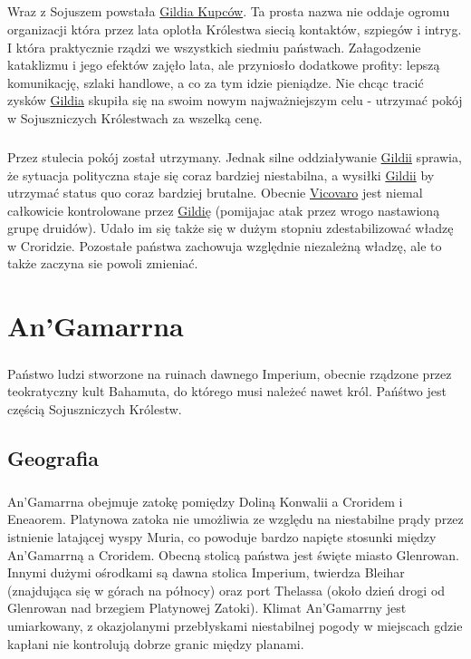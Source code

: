 \paragraph{}
Wraz z Sojuszem powstała \hyperref[GildiaKupcow]{Gildia Kupców}.
Ta prosta nazwa nie oddaje ogromu organizacji która przez lata oplotła Królestwa siecią kontaktów, szpiegów i intryg.
I która praktycznie rządzi we wszystkich siedmiu państwach.
Załagodzenie kataklizmu i jego efektów zajęło lata, ale przyniosło dodatkowe profity: lepszą komunikację, szlaki handlowe, a co za tym idzie pieniądze.
Nie chcąc tracić zysków \hyperref[GildiaKupcow]{Gildia} skupiła się na swoim nowym najważniejszym celu - utrzymać pokój w Sojuszniczych Królestwach za wszelką cenę.

\paragraph{}
Przez stulecia pokój został utrzymany.
Jednak silne oddziaływanie \hyperref[GildiaKupcow]{Gildii} sprawia, że sytuacja polityczna staje się coraz bardziej niestabilna, a wysiłki \hyperref[GildiaKupcow]{Gildii} by utrzymać status quo coraz bardziej brutalne.
Obecnie \hyperref[Vicovaro]{Vicovaro} jest niemal całkowicie kontrolowane przez \hyperref[GildiaKupcow]{Gildię} (pomijajac atak przez wrogo nastawioną grupę druidów).
Udało im się także się w dużym stopniu zdestabilizować władzę w Croridzie.
Pozostałe państwa zachowuja względnie niezależną władzę, ale to także zaczyna sie powoli zmieniać.

\chapter{An'Gamarrna}

\paragraph{}
Państwo ludzi stworzone na ruinach dawnego Imperium, obecnie rządzone przez teokratyczny kult Bahamuta, do którego musi należeć nawet król.
Pańśtwo jest częścią Sojuszniczych Królestw.

\section{Geografia}
\paragraph{}
An'Gamarrna obejmuje zatokę pomiędzy Doliną Konwalii a Croridem i Eneaorem.
Platynowa zatoka nie umożliwia ze względu na niestabilne prądy przez istnienie latającej wyspy Muria, co powoduje bardzo napięte stosunki między An'Gamarrną a Croridem.
Obecną stolicą państwa jest święte miasto Glenrowan.
Innymi dużymi ośrodkami są dawna stolica Imperium, twierdza Bleihar (znajdująca się w górach na północy) oraz port Thelassa (około dzień drogi od Glenrowan nad brzegiem Platynowej Zatoki).
Klimat An'Gamarrny jest umiarkowany, z okazjolanymi przebłyskami niestabilnej pogody w miejscach gdzie kapłani nie kontrolują dobrze granic między planami.

